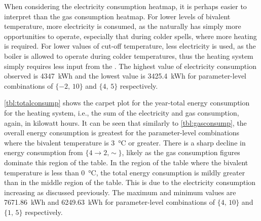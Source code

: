 When considering the electricity consumption heatmap, it is perhaps easier to interpret than the gas consumption heatmap. For lower levels of bivalent temperature, more electricity is consumed, as the \HP naturally has simply more opportunities to operate, especially that during colder spells, where more heating is required. For lower values of cut-off temperature, less electricity is used, as the boiler is allowed to operate during colder temperatures, thus the heating system simply requires less input from the \HP. The highest value of electricity consumption observed is \qty{4347}{\kWh} and the lowest value is \qty{3425.4}{\kWh} for parameter-level combinations of $\{-2\text{, }10\}$ and $\{4\text{, }5\}$ respectively. 

\begin{table}[htb]
    \footnotesize
    \centering
    \caption{Year-total electricity consumption carpet plot for each parameter-level combination $\left[\unit{\kWh\per\year}\right]$}
    \label{tbl:elecconsump}
\end{table}

\cref{tbl:totalconsump} shows the carpet plot for the year-total energy consumption for the heating system, i.e., the sum of the electricity and gas consumption, again, in kilowatt hours. It can be seen that similarly to \cref{tbl:gasconsump}, the overall energy consumption is greatest for the parameter-level combinations where the bivalent temperature is \qty{3}{\celsius} or greater. There is a sharp decline in energy consumption from $\{4\rightarrow2\text{,}\sim\}$, likely as the gas consumption figures dominate this region of the table. In the region of the table where the bivalent temperature is less than \qty{0}{\celsius}, the total energy consumption is mildly greater than in the middle region of the table. This is due to the electricity consumption increasing as discussed previously. The maximum and minimum values are \qty{7671.86}{\kWh} and \qty{6249.63}{\kWh} for parameter-level combinations of $\{4\text{, }10\}$ and $\{1\text{, }5\}$ respectively. 

